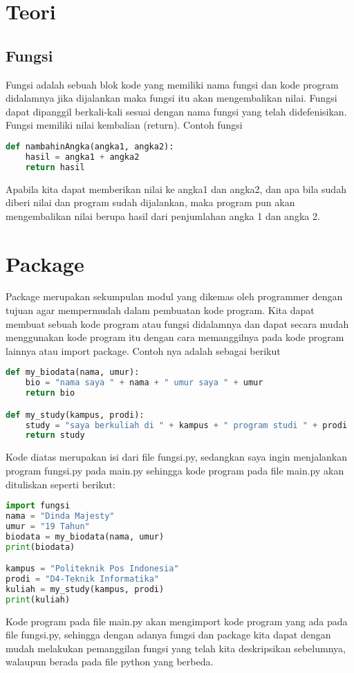 \section{Teori}
\subsection{Fungsi}
Fungsi adalah sebuah blok kode yang memiliki nama fungsi dan kode program didalamnya jika dijalankan maka fungsi itu akan mengembalikan nilai. Fungsi dapat dipanggil berkali-kali sesuai dengan nama fungsi yang telah didefenisikan. Fungsi memiliki nilai kembalian (return). Contoh fungsi
\begin{lstlisting}[language=Python]
def nambahinAngka(angka1, angka2): 
	hasil = angka1 + angka2 
	return hasil
\end{lstlisting}

Apabila kita dapat memberikan nilai ke angka1 dan angka2, dan apa bila sudah diberi nilai dan program sudah dijalankan, maka program pun akan mengembalikan nilai berupa hasil dari penjumlahan angka 1 dan angka 2.

\section{Package}
Package merupakan sekumpulan modul yang dikemas oleh programmer dengan tujuan agar mempermudah dalam pembuatan kode program. Kita dapat membuat sebuah kode program atau fungsi didalamnya dan dapat secara mudah menggunakan kode program itu dengan cara memanggilnya pada kode program lainnya atau import package. Contoh nya adalah sebagai berikut
\begin{lstlisting}[language=Python]
def my_biodata(nama, umur): 
	bio = "nama saya " + nama + " umur saya " + umur 
	return bio 

def my_study(kampus, prodi): 
	study = "saya berkuliah di " + kampus + " program studi " + prodi
	return study
\end{lstlisting}
Kode diatas merupakan isi dari ﬁle fungsi.py, sedangkan saya ingin menjalankan program fungsi.py pada main.py sehingga kode program pada ﬁle main.py akan dituliskan seperti berikut:
\begin{lstlisting}[language=Python]
import fungsi
nama = "Dinda Majesty" 
umur = "19 Tahun" 
biodata = my_biodata(nama, umur) 
print(biodata)

kampus = "Politeknik Pos Indonesia" 
prodi = "D4-Teknik Informatika" 
kuliah = my_study(kampus, prodi) 
print(kuliah)
\end{lstlisting}
Kode program pada ﬁle main.py akan mengimport kode program yang ada pada ﬁle fungsi.py, sehingga dengan adanya fungsi dan package kita dapat dengan mudah melakukan pemanggilan fungsi yang telah kita deskripsikan sebelumnya, walaupun berada pada ﬁle python yang berbeda.

